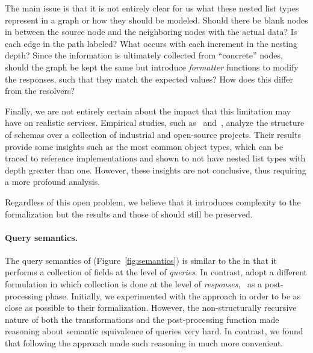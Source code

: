 The main issue is that it is not entirely clear for us what these nested list types represent in a graph or how they should be modeled. 
Should there be blank nodes in between the source node and the neighboring nodes with the actual data? Is each edge in the path labeled?
What occurs with each increment in the nesting depth? Since the information is ultimately collected from ``concrete'' nodes, should the graph be kept the same 
but introduce \textit{formatter} functions to modify the responses, such that they match the expected values? How does this differ from the \gql resolvers?

Finally, we are not entirely certain about the impact that this limitation may have on realistic \gql services. 
Empirical studies, such as~\cite{empiricalgql} and~\cite{empiricalapi}, analyze the structure of \gql schemas 
over a collection of industrial and open-source projects. Their results provide some insights such as the most 
common object types, which can be traced to reference implementations and shown to not have nested list types 
with depth greater than one. However, these insights are not conclusive, thus requiring a more profound analysis. 

Regardless of this open problem, we believe that it introduces complexity to the formalization but the results and those of \HP should still be preserved.


\paragraph{Query semantics.}
\mbox{}

The query semantics of \gcoql (Figure~\ref{fig:semantics}) is similar to the \spec in that it performs a collection of fields at the level of {\em queries}. In contrast, \HP adopt a different formulation in which collection is done at the level of {\em responses}, \ie~as a post-processing phase. Initially, we experimented with the \HP approach in order to be as close as possible to their formalization. However, the non-structurally recursive nature of both the transformations and the post-processing function made reasoning about semantic equivalence of queries very hard. In contrast, we found that following the \spec approach made such reasoning in \coq much more convenient. 

